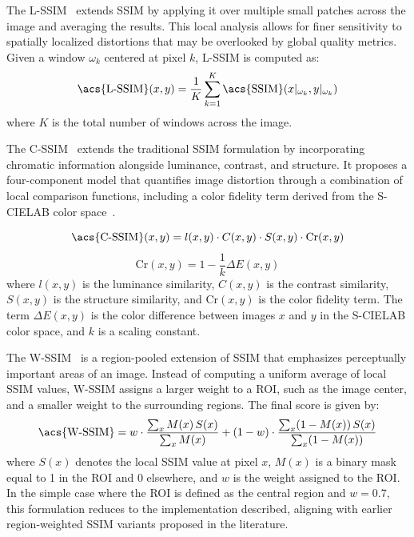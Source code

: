 The \acf{L-SSIM}~\cite{wang2004image} extends \acs{SSIM} by applying it over multiple small patches across the image and averaging the results. This local analysis allows for finer sensitivity to spatially localized distortions that may be overlooked by global quality metrics. Given a window $\omega_k$ centered at pixel $k$, \acs{L-SSIM} is computed as:
\begin{equation}
\text{\acs{L-SSIM}}(x, y) = \frac{1}{K} \sum_{k=1}^{K} \text{\acs{SSIM}}(x|_{\omega_k}, y|_{\omega_k})
\end{equation}
where $K$ is the total number of windows across the image.

The \acf{C-SSIM}~\cite{hassan2017cssim} extends the traditional SSIM formulation by incorporating chromatic information alongside luminance, contrast, and structure. It proposes a four-component model that quantifies image distortion through a combination of local comparison functions, including a color fidelity term derived from the \acf{S-CIELAB} color space~\cite{zhang1997scielab}.

\begin{equation}
\text{\acs{C-SSIM}}(x, y) = l(x, y) \cdot C(x, y) \cdot S(x, y) \cdot \text{Cr}(x, y)
\end{equation}
\begin{equation}
\text{Cr}(x, y) = 1 - \frac{1}{k} \Delta E(x, y)
\end{equation}
where $l(x, y)$ is the luminance similarity, $C(x, y)$ is the contrast similarity, $S(x, y)$ is the structure similarity, and $\text{Cr}(x, y)$ is the color fidelity term. The term $\Delta E(x, y)$ is the color difference between images $x$ and $y$ in the \acs{S-CIELAB} color space, and $k$ is a scaling constant.

The \acf{W-SSIM}~\cite{li2009wssim,li2010wssim} is a region-pooled extension of \acs{SSIM} that emphasizes perceptually important areas of an image. Instead of computing a uniform average of local \acs{SSIM} values, \acs{W-SSIM} assigns a larger weight to a \acf{ROI}, such as the image center, and a smaller weight to the surrounding regions. The final score is given by:
\begin{equation}
\text{\acs{W-SSIM}} = w \cdot \frac{\sum_{x} M(x)\,S(x)}{\sum_{x} M(x)} + (1-w) \cdot \frac{\sum_{x} (1-M(x))\,S(x)}{\sum_{x} (1-M(x))}
\end{equation}
where $S(x)$ denotes the local SSIM value at pixel $x$, $M(x)$ is a binary mask equal to 1 in the \acs{ROI} and 0 elsewhere, and $w$ is the weight assigned to the \acs{ROI}. In the simple case where the \acs{ROI} is defined as the central region and $w=0.7$, this formulation reduces to the implementation described, aligning with earlier region-weighted \acs{SSIM} variants proposed in the literature.

